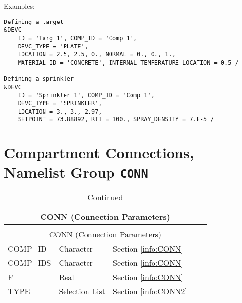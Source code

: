 
\vspace{\baselineskip}
\noindent Examples:
\begin{lstlisting}
Defining a target
&DEVC
	ID = 'Targ 1', COMP_ID = 'Comp 1',
	DEVC_TYPE = 'PLATE',
	LOCATION = 2.5, 2.5, 0., NORMAL = 0., 0., 1.,
	MATERIAL_ID = 'CONCRETE', INTERNAL_TEMPERATURE_LOCATION = 0.5 /

Defining a sprinkler
&DEVC
	ID = 'Sprinkler 1', COMP_ID = 'Comp 1',
	DEVC_TYPE = 'SPRINKLER',
	LOCATION = 3., 3., 2.97,
	SETPOINT = 73.88892, RTI = 100., SPRAY_DENSITY = 7.E-5 /
\end{lstlisting}



\clearpage
\section{Compartment Connections, Namelist Group \texorpdfstring{{\tt CONN}}{CONN}}

\begin{longtable}{@{\extracolsep{\fill}}|l|l|l|l|l|}
\caption[Connection Parameters ({\ct CONN} namelist group)]{For more information see Section~\ref{info:CONN}.}
\label{tbl:CONN} \\
\hline
\multicolumn{5}{|c|}{{\ct CONN} (Connection Parameters)} \\
\hline \hline
\endfirsthead
\caption[]{Continued} \\
\hline
\multicolumn{5}{|c|}{{\ct CONN} (Connection Parameters)} \\
\hline \hline
\endhead
{\ct COMP\_ID}              & Character & Section \ref{info:CONN}                 &           &  		\\ \hline
{\ct COMP\_IDS}              & Character & Section \ref{info:CONN}                 &           &  		\\ \hline
{\ct F}             & Real      & Section \ref{info:CONN}     &           &                 \\ \hline
{\ct TYPE}        	    & Selection List     & Section \ref{info:CONN2}                 &           &                 \\ \hline
\end{longtable}

